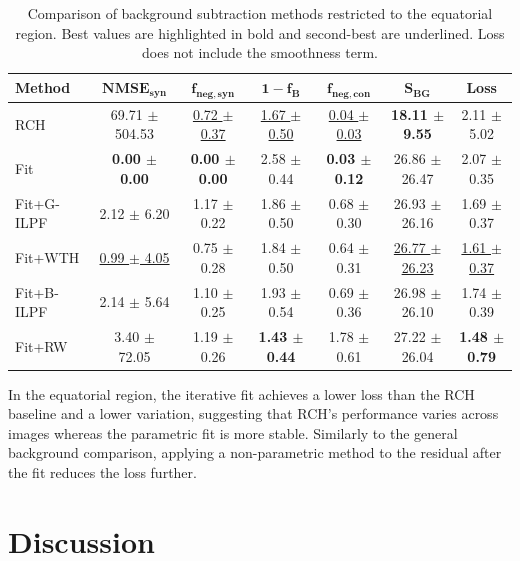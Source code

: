 \documentclass[journal,article,submit,moreauthors]{Definitions/mdpi}
\begin{document}
\begin{table}[t]
\caption{Comparison of background subtraction methods restricted to the equatorial region. Best values are highlighted in bold and second-best are underlined. Loss does not include the smoothness term.}
\label{tab:two_stage_equator}
\centering
\small
\setlength{\tabcolsep}{3pt}
\renewcommand{\arraystretch}{1.1}
\begin{tabular}{@{}lcccccc@{}}
\toprule
\textbf{Method} & $\mathbf{NMSE}_{\mathbf{syn}}$ & $\mathbf{f}_{\mathbf{neg,syn}}$ & $\mathbf{1-f_B}$ & $\mathbf{f}_{\mathbf{neg,con}}$ & $\mathbf{S}_{\mathbf{BG}}$ & \textbf{Loss} \\
\midrule
RCH & 69.71 $\pm$ 504.53 & \underline{0.72 $\pm$ 0.37} & \underline{1.67 $\pm$ 0.50} & \underline{0.04 $\pm$ 0.03} & \textbf{18.11 $\pm$ 9.55} & 2.11 $\pm$ 5.02 \\
Fit & \textbf{0.00 $\pm$ 0.00} & \textbf{0.00 $\pm$ 0.00} & 2.58 $\pm$ 0.44 & \textbf{0.03 $\pm$ 0.12} & 26.86 $\pm$ 26.47 & 2.07 $\pm$ 0.35 \\
Fit+G-ILPF & 2.12 $\pm$ 6.20 & 1.17 $\pm$ 0.22 & 1.86 $\pm$ 0.50 & 0.68 $\pm$ 0.30 & 26.93 $\pm$ 26.16 & 1.69 $\pm$ 0.37 \\
Fit+WTH & \underline{0.99 $\pm$ 4.05} & 0.75 $\pm$ 0.28 & 1.84 $\pm$ 0.50 & 0.64 $\pm$ 0.31 & \underline{26.77 $\pm$ 26.23} & \underline{1.61 $\pm$ 0.37} \\
Fit+B-ILPF & 2.14 $\pm$ 5.64 & 1.10 $\pm$ 0.25 & 1.93 $\pm$ 0.54 & 0.69 $\pm$ 0.36 & 26.98 $\pm$ 26.10 & 1.74 $\pm$ 0.39 \\
Fit+RW & 3.40 $\pm$ 72.05 & 1.19 $\pm$ 0.26 & \textbf{1.43 $\pm$ 0.44} & 1.78 $\pm$ 0.61 & 27.22 $\pm$ 26.04 & \textbf{1.48 $\pm$ 0.79} \\
\bottomrule
\end{tabular}
\end{table}

In the equatorial region, the iterative fit achieves a lower loss than the RCH baseline and a lower variation, suggesting that RCH's performance varies across images whereas the parametric fit is more stable. Similarly to the general background comparison, applying a non-parametric method to the residual after the fit reduces the loss further.

\section{Discussion}
\label{sec:discussion}
\end{document}
